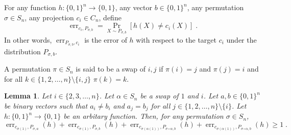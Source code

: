 \documentclass[10pt]{article}
\newtheorem{lemma}[proposition]{Lemma}
\DeclareMathOperator{\err}{err}
\begin{document}
For any function $h:\{0,1\}^n \to \{0,1\}$, any vector $b \in \{0,1\}^n$,
any permutation $\sigma \in S_n$, any projection $c_i \in C_n$, define
$$
\err_{c_i,P_{\sigma,b}} = \Pr_{X \sim P_{\sigma,b}}[h(X) \neq c_i(X)] \; .
$$
In other words, $\err_{P_{\sigma,b},c_i}$ is
the error of $h$ with respect to the target $c_i$
under the distribution $P_{\sigma,b}$.

A permutation $\pi \in S_n$ is said to be a swap of $i,j$
if $\pi(i) = j$ and $\pi(j) = i$ and for all $k \in \{1,2,\dots,n\} \setminus \{i,j\}$
$\pi(k) = k$.

\begin{lemma}
\label{lemma:projection-distances}
Let $i \in \{2,3,\dots,n\}$. Let $\alpha \in S_n$ be a swap of $1$ and $i$.
Let $a,b \in \{0,1\}^n$ be binary vectors such that $a_i \neq b_i$
and $a_j = b_j$ for all $j \in \{1,2,\dots,n\} \setminus \{i\}$.
Let $h:\{0,1\}^n \to \{0,1\}$ be an arbitary function. Then, for any permutation $\sigma \in S_n$,
$$
\err_{c_{\sigma(1)},P_{\sigma,a}}(h) + \err_{c_{\sigma(1)},P_{\sigma,b}}(h) +
\err_{c_{\sigma(\alpha(1))},P_{\sigma \circ \alpha,b}}(h) + \err_{c_{\sigma(\alpha(1))},P_{\sigma \circ \alpha,b}}(h) \ge 1 \; .
$$
\end{lemma}
\end{document}
